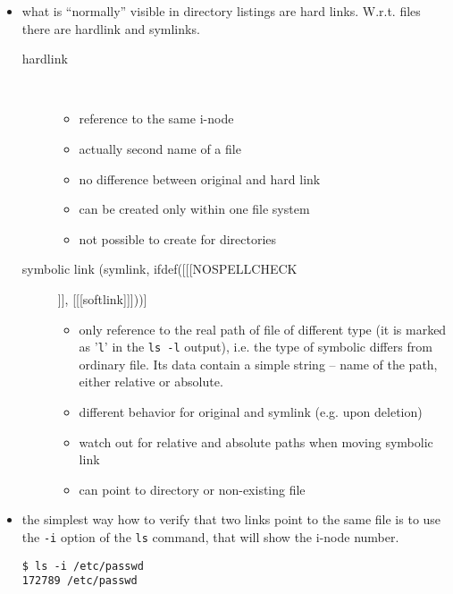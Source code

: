 \begin{itemize}
\item what is ``normally'' visible in directory listings are hard links.
W.r.t. files there are  hardlink and symlinks.

\begin{description}
\item[hardlink]~

    \begin{itemize}
    \item reference to the same i-node
    \item actually second name of a file
    \item no difference between original and hard link
    \item can be created only within one file system
    \item not possible to create for directories
    \end{itemize}
\item [symbolic link (symlink, ifdef([[[NOSPELLCHECK]]], [[[softlink]]]))]~

    \begin{itemize}
    \item only reference to the real path of file of different type
    (it is marked as '\texttt{l}' in the \texttt{ls -l} output), i.e. the type
    of symbolic differs from ordinary file. Its data contain a simple string
    -- name of the path, either relative or absolute.
    \item different behavior for original and symlink (e.g. upon deletion)
    \item watch out for relative and absolute paths when moving symbolic link
    \item can point to directory or non-existing file
    \end{itemize}
\end{description}

\item the simplest way how to verify that two links point to the same file is to
use the \texttt{-i} option of the \texttt{ls} command, that will show the i-node
number.

\begin{verbatim}
$ ls -i /etc/passwd
172789 /etc/passwd
\end{verbatim}
\end{itemize}


